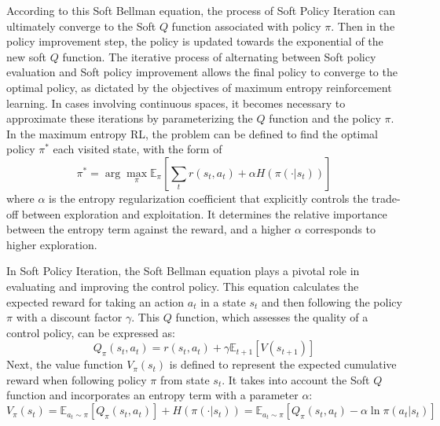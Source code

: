 According to this Soft Bellman equation\cite{haarnojaSoftActorCriticOffPolicy2018}, the process of Soft Policy Iteration can ultimately converge to the Soft $Q$ function associated with policy $\pi$. Then in the policy improvement step, the policy is updated towards the exponential of the new soft $Q$ function. The iterative process of alternating between Soft policy evaluation and Soft policy improvement allows the final policy to converge to the optimal policy, as dictated by the objectives of maximum entropy reinforcement learning. In cases involving continuous spaces, it becomes necessary to approximate these iterations by parameterizing the $Q$ function and the policy $\pi$. In the maximum entropy RL, the problem can be defined to find the optimal policy $\pi^*$ each visited state, with the form of 
\begin{equation}
    \pi^* = \arg\max_\pi\mathbb{E}_\pi [\sum_t r(s_t,a_t)+\alpha H(\pi(\cdot|s_t))]
    \label{eq:bellman}
\end{equation} 
where $\alpha$ is the entropy regularization coefficient that explicitly controls the trade-off between exploration and exploitation. It determines the relative importance between the entropy term against the reward, and a higher $\alpha$ corresponds to higher exploration. 

In Soft Policy Iteration, the Soft Bellman equation plays a pivotal role in evaluating and improving the control policy. This equation calculates the expected reward for taking an action $a_t$ in a state $s_t$ and then following the policy $\pi$ with a discount factor $\gamma$.  This $Q$ function, which assesses the quality of a control policy, can be expressed as:
\begin{equation}
    Q_\pi(s_t,a_t) = r(s_t,a_t) + \gamma\mathbb{E}_{t+1}[V(s_{t+1})]
    \label{eq:Q}
\end{equation} 
Next, the value function $V_\pi(s_t)$ is defined to represent the expected cumulative reward when following policy $\pi$ from state $s_t$. It takes into account the Soft $Q$ function and incorporates an entropy term with a parameter $\alpha$:
\begin{equation}
    V_\pi(s_t) = \mathbb{E}_{a_t\sim \pi}[Q_\pi(s_t,a_t)] + H(\pi(\cdot|s_t)) = \mathbb{E}_{a_t\sim \pi}[Q_\pi(s_t,a_t) - \alpha\ln\pi(a_t|s_t)]
    \label{eq:valuef}
\end{equation}

